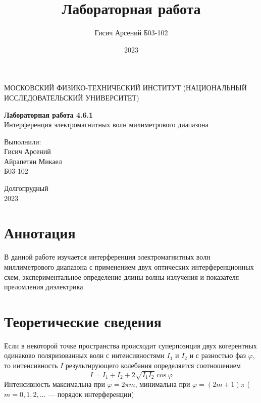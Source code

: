 \documentclass[a4paper, 12pt]{article}
\title{Лабораторная работа}
\author{Гисич Арсений Б03-102}
\date{2023}
\begin{document}
	\begin{center}
		{\large МОСКОВСКИЙ ФИЗИКО-ТЕХНИЧЕСКИЙ ИНСТИТУТ (НАЦИОНАЛЬНЫЙ ИССЛЕДОВАТЕЛЬСКИЙ УНИВЕРСИТЕТ)}
	\end{center}
	\vspace{5 cm}
	{\Large
		\begin{center}
			{\bf Лабораторная работа 4.6.1}\\[0.2 cm]
			Интерференция электромагнитных волн милиметрового диапазона
		\end{center}
	}
	\vspace{4 cm}
	\begin{flushright}
		{\Large Выполнили: \\
			\vspace{0.2 cm}
			Гисич Арсений \\
            Айрапетян Микаел \\
			\vspace{0.2 cm}
			Б03-102 \\}
	\end{flushright}
	\vspace{7 cm}
	\begin{center}
		Долгопрудный\\[0.1 cm]
		2023
	\end{center}
\thispagestyle{empty}


\section{Аннотация}

В данной работе изучается интерференция электромагнитных волн миллиметрового диапазона с применением двух оптических интерференционных схем, экспериментальное определение длины волны излучения и показателя преломления диэлектрика



\section{Теоретические сведения}

Если в некоторой точке пространства происходит суперпозиция двух когерентных одинаково поляризованных волн с интенсивностями $I_1$ и $I_2$ и с разностью фаз $\varphi$, то интенсивность $I$ результирующего колебания определяется соотношением 
\begin{equation}
    I = I_1 + I_2 + 2\sqrt{I_1 I_2}\cos \varphi
\end{equation}
Интенсивность максимальна при $\varphi = 2\pi m$, минимальна при $\varphi = (2m+1)\pi$ ($m = 0, 1, 2, ...$ --- порядок интерференции)
\end{document}
